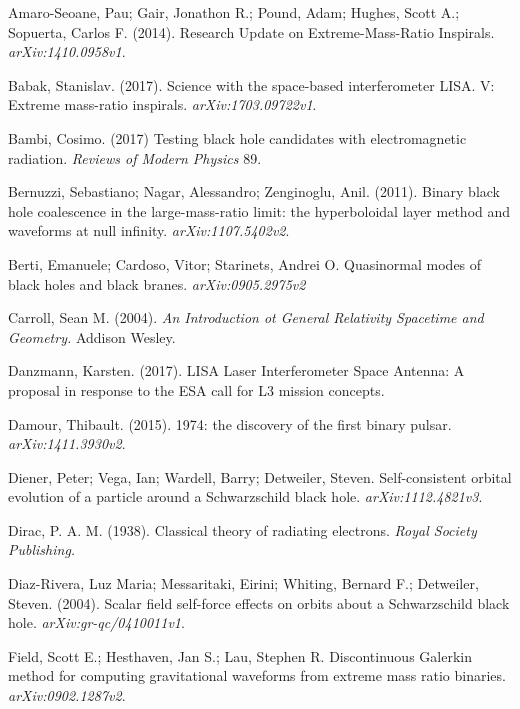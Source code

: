 Amaro-Seoane, Pau; Gair, Jonathon R.; Pound, Adam; Hughes, Scott A.; Sopuerta, Carlos F. (2014). Research Update on Extreme-Mass-Ratio Inspirals. {\em arXiv:1410.0958v1}.



Babak, Stanislav. (2017). Science with the space-based interferometer LISA. V: Extreme mass-ratio inspirals. {\em arXiv:1703.09722v1}.


  Bambi, Cosimo. (2017) Testing black hole candidates with electromagnetic radiation. {\em Reviews of Modern Physics} 89.


Bernuzzi, Sebastiano; Nagar, Alessandro; Zenginoglu, Anil. (2011). Binary black hole coalescence in the large-mass-ratio limit: the hyperboloidal layer method and waveforms at null infinity. {\em arXiv:1107.5402v2}.


Berti, Emanuele; Cardoso, Vitor; Starinets, Andrei O. Quasinormal modes of black holes and black branes. {\em arXiv:0905.2975v2}

Carroll, Sean M. (2004). {\em An Introduction ot General Relativity Spacetime and Geometry.} Addison Wesley.


Danzmann, Karsten. (2017). LISA Laser Interferometer Space Antenna: A proposal in response to the ESA call for L3 mission concepts. 

Damour, Thibault. (2015). 1974: the discovery of the first binary pulsar. {\em arXiv:1411.3930v2}.

Diener, Peter; Vega, Ian; Wardell, Barry; Detweiler, Steven. Self-consistent orbital evolution of a particle around a Schwarzschild black hole. {\em arXiv:1112.4821v3}.

Dirac, P. A. M. (1938). Classical theory of radiating electrons. {\em Royal Society Publishing.}


Diaz-Rivera, Luz Maria; Messaritaki, Eirini; Whiting, Bernard F.; Detweiler, Steven. (2004). Scalar field self-force effects on orbits about a Schwarzschild black hole. {\em arXiv:gr-qc/0410011v1}.

Field, Scott E.; Hesthaven, Jan S.; Lau, Stephen R. Discontinuous Galerkin method for computing gravitational waveforms from extreme mass ratio binaries. {\em arXiv:0902.1287v2}.

